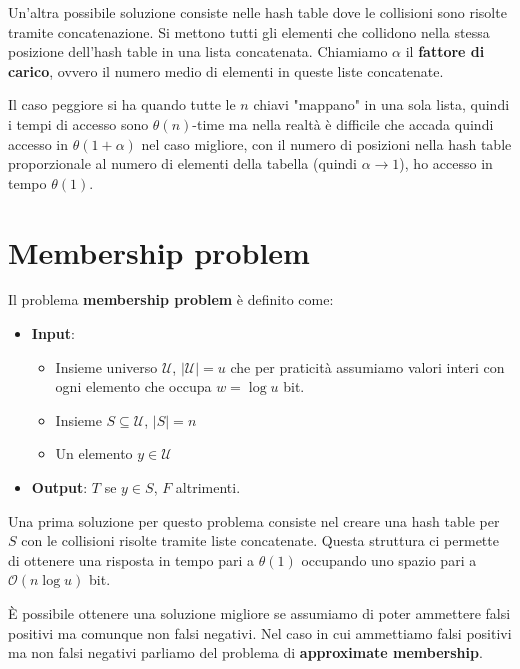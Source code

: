 Un'altra possibile soluzione consiste nelle hash table dove le collisioni sono
risolte tramite concatenazione. Si mettono tutti gli elementi che collidono nella
stessa posizione dell'hash table in una lista concatenata. Chiamiamo $\alpha$ il
\textbf{fattore di carico}, ovvero il numero medio di elementi in queste liste concatenate.

Il caso peggiore si ha quando tutte le $n$ chiavi "mappano" in una sola lista,
quindi i tempi di accesso sono $\theta(n)$-time ma nella realtà è difficile che
accada quindi accesso in $\theta(1 + \alpha)$ nel caso migliore, con il numero di
posizioni nella hash table proporzionale al numero di elementi della tabella
(quindi $\alpha \to 1$), ho accesso in tempo $\theta(1)$.
\section{Membership problem}
\begin{definizione}
    Il problema \textbf{membership problem} è definito come:
    \begin{itemize}
        \item \textbf{Input}:
              \begin{itemize}
                  \item Insieme universo $\mathcal{U}$, $|\mathcal{U}| = u$ che
                        per praticità assumiamo valori interi con ogni elemento che
                        occupa $w = \log u$ bit.
                  \item Insieme $S \subseteq \mathcal{U}$, $|S| = n$
                  \item Un elemento $y \in \mathcal{U}$
              \end{itemize}
        \item \textbf{Output}: $T$ se $y \in S$, $F$ altrimenti.
    \end{itemize}
\end{definizione}

Una prima soluzione per questo problema consiste nel creare una hash table per $S$
con le collisioni risolte tramite liste concatenate. Questa struttura ci permette
di ottenere una risposta in tempo pari a $\theta(1)$ occupando uno spazio pari a
$\mathcal{O}(n \log u)$ bit.

È possibile ottenere una soluzione migliore se assumiamo di poter ammettere falsi
positivi ma comunque non falsi negativi. Nel caso in cui ammettiamo falsi positivi
ma non falsi negativi parliamo del problema di \textbf{approximate membership}.

